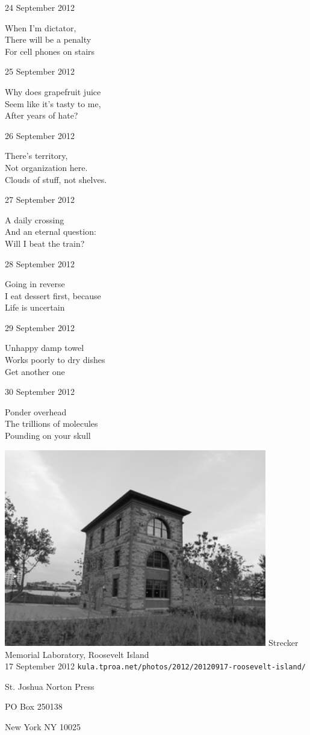 \documentclass[12pt]{article}
\begin{document}
24 September 2012

When I'm dictator, \\
There will be a penalty \\
For cell phones on stairs

25 September 2012

Why does grapefruit juice \\
Seem like it's tasty to me, \\
After years of hate?

26 September 2012

There's territory, \\
Not organization here. \\
Clouds of stuff, not shelves.

27 September 2012

A daily crossing \\
And an eternal question: \\
Will I beat the train?

28 September 2012

Going in reverse \\
I eat dessert first, because \\
Life is uncertain

29 September 2012

Unhappy damp towel \\
Works poorly to dry dishes \\
Get another one

30 September 2012

Ponder overhead \\
The trillions of molecules \\
Pounding on your skull

\newpage

\begin{center}
\includegraphics[width=325pt]{roosevelt.png}
Strecker Memorial Laboratory, Roosevelt Island \\
17 September 2012
{\tt kula.tproa.net/photos/2012/20120917-roosevelt-island/ }

\end{center}

\newpage

\thispagestyle{empty}
\vspace*{12cm}
\begin{sideways}
\Large{St. Joshua Norton Press}
\end{sideways}
\begin{sideways}
\Large{PO Box 250138}
\end{sideways}
\begin{sideways}
\Large{New York NY 10025}
\end{sideways}
\end{document}
